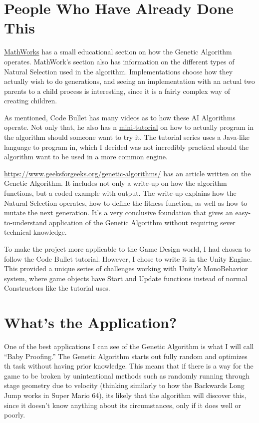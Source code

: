 \documentclass[twoside]{article}
\begin{document}
    \section{People Who Have Already Done This}\label{sec:people-who-have-already-done-this}
    \href{https://www.mathworks.com/help/gads/what-is-the-genetic-algorithm.html#:~:text=The%20genetic%20algorithm%20is%20a,process%20that%20drives%20biological%20evolution}{MathWorks} has a small educational section on how the Genetic Algorithm operates.
    MathWork's section also has information on the different types of Natural Selection used in the algorithm.
    Implementations choose how they actually wish to do generations, and seeing an implementation with an actual two parents to a child process is interesting, since it is a fairly complex way of creating children.

    \bigbreak
    \noindent
    As mentioned, Code Bullet has many videos as to how these AI Algorithms operate.
    Not only that, he also has n \href{https://www.youtube.com/watch?v=VnwjxityDLQ}{mini-tutorial} on how to actually program in the algorithm should someone want to try it.
    The tutorial series uses a Java-like language to program in, which I decided was not incredibly practical should the algorithm want to be used in a more common engine.

    \bigbreak
    \noindent
    \href{Geeks For Geeks}{https://www.geeksforgeeks.org/genetic-algorithms/} has an article written on the Genetic Algorithm.
    It includes not only a write-up on how the algorithm functions, but a coded example with output.
    The write-up explains how the Natural Selection operates, how to define the fitness function, as well as how to mutate the next generation.
    It's a very conclusive foundation that gives an easy-to-understand application of the Genetic Algorithm without requiring sever technical knowledge.

    \bigbreak
    \noindent
    To make the project more applicable to the Game Design world, I had chosen to follow the Code Bullet tutorial.
    However, I chose to write it in the Unity Engine.
    This provided a unique series of challenges working with Unity's MonoBehavior system, where game objects have Start and Update functions instead of normal Constructors like the tutorial uses.

    \section{What's the Application?}\label{sec:what's-the-application?}
    One of the best applications I can see of the Genetic Algorithm is what I will call ``Baby Proofing.''
    The Genetic Algorithm starts out fully random and optimizes th task without having prior knowledge.
    This means that if there is a way for the game to be broken by unintentional methods such as randomly running through stage geometry due to velocity (thinking similarly to how the Backwards Long Jump works in Super Mario 64), its likely that the algorithm will discover this, since it doesn't know anything about its circumstances, only if it does well or poorly.
\end{document}
